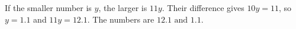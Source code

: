 If the smaller number is $y$, the larger is $11y$. Their difference gives $10y=11$, so $y=1.1$ and $11y=12.1$. The numbers are $\boxed{12.1\text{ and }1.1}$.

